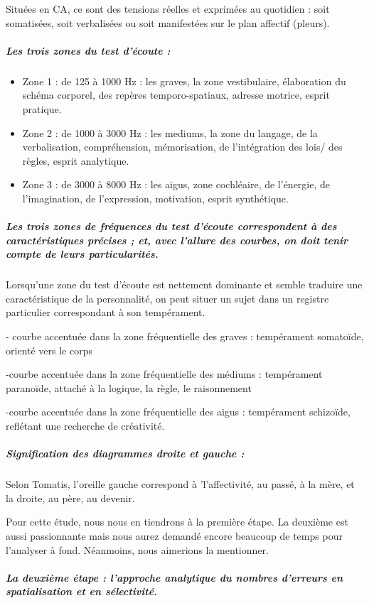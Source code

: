 Situées en CA, ce sont des tensions réelles et exprimées au quotidien
: soit somatisées, soit verbalisées ou soit manifestées sur le plan
affectif (pleurs).

\subparagraph{Les trois zones du test d'écoute : }
\begin{itemize}
\item Zone 1 : de 125 à 1000 Hz : les graves, la zone vestibulaire, élaboration
du schéma corporel, des repères temporo-spatiaux, adresse motrice,
esprit pratique.
\item Zone 2 : de 1000 à 3000 Hz : les mediums, la zone du langage, de la
verbalisation, compréhension, mémorisation, de l'intégration des lois/
des règles, esprit analytique.
\item Zone 3 : de 3000 à 8000 Hz : les aigus, zone cochléaire, de l'énergie,
de l'imagination, de l'expression, motivation, esprit synthétique.
\end{itemize}

\subparagraph{Les trois zones de fréquences du test d'écoute correspondent à des
caractéristiques précises ; et, avec l'allure des courbes, on doit
tenir compte de leurs particularités.}

Lorsqu'une zone du test d'écoute est nettement dominante et semble
traduire une caractéristique de la personnalité, on peut situer un
sujet dans un registre particulier correspondant à son tempérament.

- courbe accentuée dans la zone fréquentielle des graves : tempérament
somatoïde, orienté vers le corps

-courbe accentuée dans la zone fréquentielle des médiums : tempérament
paranoïde, attaché à la logique, la règle, le raisonnement 

-courbe accentuée dans la zone fréquentielle des aigus : tempérament
schizoïde, reflétant une recherche de créativité. 

\subparagraph{Signification des diagrammes droite et gauche : }

Selon Tomatis, l'oreille gauche correspond à \textquoteright l'affectivité,
au passé, à la mère, et la droite, au père, au devenir.

Pour cette étude, nous nous en tiendrons à la première étape. La deuxième est aussi passionnante mais nous aurez demandé encore beaucoup de temps pour l'analyser à fond. Néanmoins, nous aimerions la mentionner.

\subparagraph{La deuxième étape : l'approche analytique du nombres d'erreurs en
spatialisation et en sélectivité.}


